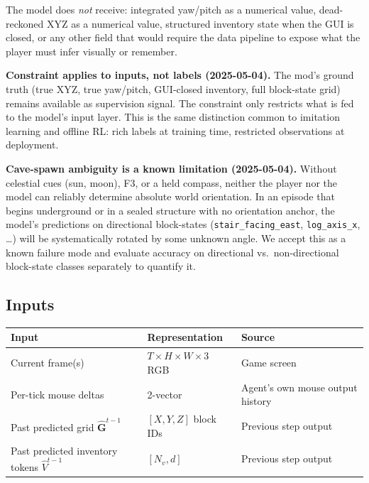 \documentclass[11pt,a4paper]{article}
\begin{document}
The model does \textit{not} receive: integrated yaw/pitch as a numerical value, dead-reckoned XYZ as a numerical value, structured inventory state when the GUI is closed, or any other field that would require the data pipeline to expose what the player must infer visually or remember.

\begin{designdecision}
\textbf{Constraint applies to inputs, not labels (2025-05-04).} The mod's ground truth (true XYZ, true yaw/pitch, GUI-closed inventory, full block-state grid) remains available as supervision signal. The constraint only restricts what is fed to the model's input layer. This is the same distinction common to imitation learning and offline RL: rich labels at training time, restricted observations at deployment.
\end{designdecision}

\begin{designdecision}
\textbf{Cave-spawn ambiguity is a known limitation (2025-05-04).} Without celestial cues (sun, moon), F3, or a held compass, neither the player nor the model can reliably determine absolute world orientation. In an episode that begins underground or in a sealed structure with no orientation anchor, the model's predictions on directional block-states (\texttt{stair\_facing\_east}, \texttt{log\_axis\_x}, \ldots) will be systematically rotated by some unknown angle. We accept this as a known failure mode and evaluate accuracy on directional vs.\ non-directional block-state classes separately to quantify it.
\end{designdecision}

\subsection{Inputs}

\begin{center}
\begin{tabular}{lll}
\toprule
Input & Representation & Source \\
\midrule
Current frame(s) & $T \times H \times W \times 3$ RGB & Game screen \\
Per-tick mouse deltas & 2-vector & Agent's own mouse output history \\
Past predicted grid $\hat{\mathbf{G}}^{t-1}$ & $[X, Y, Z]$ block IDs & Previous step output \\
Past predicted inventory tokens $\hat{V}^{t-1}$ & $[N_v, d]$ & Previous step output \\
\bottomrule
\end{tabular}
\end{center}
\end{document}
